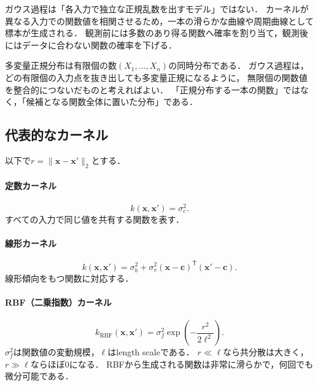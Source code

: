 \documentclass[a4paper,11pt]{ltjsarticle}
\newcommand{\T}{\mathsf T}
\begin{document}
ガウス過程は「各入力で独立な正規乱数を出すモデル」ではない．
カーネルが異なる入力での関数値を相関させるため，一本の滑らかな曲線や周期曲線として標本が生成される．
観測前には多数のあり得る関数へ確率を割り当て，観測後にはデータに合わない関数の確率を下げる．

\begin{intuitionbox}[有限次元の正規分布から関数の分布へ]
多変量正規分布は有限個の数\((X_1,\ldots,X_n)\)の同時分布である．
ガウス過程は，どの有限個の入力点を抜き出しても多変量正規になるように，
無限個の関数値を整合的につないだものと考えればよい．
「正規分布する一本の関数」ではなく，「候補となる関数全体に置いた分布」である．
\end{intuitionbox}

\subsection{代表的なカーネル}
\label{sec:kernel-examples}

以下で\(r=\|\bm x-\bm x'\|_2\)とする．

\paragraph{定数カーネル}
\begin{equation}
  k(\bm x,\bm x')=\sigma_c^2.
\end{equation}
すべての入力で同じ値を共有する関数を表す．

\paragraph{線形カーネル}
\begin{equation}
  k(\bm x,\bm x')
  =\sigma_b^2+\sigma_v^2(\bm x-\bm c)^\T(\bm x'-\bm c).
\end{equation}
線形傾向をもつ関数に対応する．

\paragraph{RBF（二乗指数）カーネル}
\begin{equation}
  k_{\mathrm{RBF}}(\bm x,\bm x')
  =\sigma_f^2
  \exp\left(-\frac{r^2}{2\ell^2}\right).
  \label{eq:rbf-kernel}
\end{equation}
\(\sigma_f^2\)は関数値の変動規模，\(\ell\)はlength scaleである．
\(r\ll\ell\)なら共分散は大きく，\(r\gg\ell\)ならほぼ0になる．
RBFから生成される関数は非常に滑らかで，何回でも微分可能である．
\end{document}
